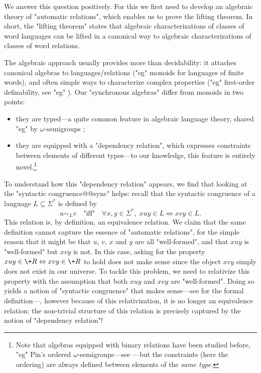 We answer this question positively.
For this we first need to develop an algebraic theory of "automatic relations",
which enables us to prove the lifting theorem. In short, the "lifting theorem" states that algebraic characterizations of classes of word languages can be lifted in a canonical way to algebraic characterizations of classes of word relations.

The algebraic approach usually provides more than decidability: it attaches
canonical algebras to languages/relations ("eg" monoids for languages of finite words), and often simple ways to characterize complex properties ("eg" first-order definability, see "eg" \cite[Theorem 2.6, p.~40]{Bojanczyk2020MSO}).
Our "synchronous algebras" differ from monoids in two points:
\begin{itemize}
	\item they are typed---a quite common feature in algebraic language theory, shared "eg" by $\omega$-semigroups \cite[\S~4.1, p.~91]{Perrin2004InfiniteWords};
	\item they are equipped with a "dependency relation", which expresses constraints between 
	elements of different types---to our knowledge, this feature is entirely novel.\footnote{Note that algebras equipped with binary relations have been studied before, "eg" Pin's ordered 
	$\omega$-semigroups---see \cite[\S~2.4, p.~7]{Pin1998PositiveVarieties}---but the constraints (here the ordering) are always defined between elements of the \emph{same type}.}
\end{itemize}
To understand how this "dependency relation" appears, we find that
looking at the "syntactic congruence@@sync" helps:
recall that the syntactic congruence of a language $L \subseteq \Sigma^*$
is defined by
\[
	u \sim_{L} v \quad\text{"iff"}\quad
	\forall x,y\in \Sigma^*,\; xuy \in L \Leftrightarrow xvy \in L.
\]
This relation is, by definition, an equivalence relation.
We claim that the same definition cannot capture the essence of
"automatic relations", for the simple reason that it might be that
$u$, $v$, $x$ and $y$ are all "well-formed", and that
$xuy$ is "well-formed" but $xvy$ is not. In this case, 
asking for the property $xuy \in \+R \Leftrightarrow xvy \in \+R$ 
to hold does not make sense since the object $xvy$ simply does not exist
in our universe. To tackle this problem, we need to relativize this
property with the assumption that both $xuy$ and $xvy$ are "well-formed".
Doing so yields a notion of "syntactic congruence" that
makes sense---see  for the formal definition---,
however because of this relativization, it is no longer an equivalence relation:
the non-trivial structure of this relation is precisely captured by the notion
of "dependency relation"!

